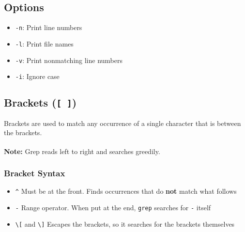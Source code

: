 \documentclass[13pt]{article}
\begin{document}
\subsection{Options}
\begin{itemize}[leftmargin = 0pt]
\item [] \texttt{-n}: Print line numbers
\item [] \texttt{-l}: Print file names
\item [] \texttt{-v}: Print nonmatching line numbers
\item [] \texttt{-i}: Ignore case
\end{itemize}
\subsection{Brackets (\texttt{[ ]})}
Brackets are used to match any occurrence of a single character that is between the brackets. \\ \\
\textbf{Note:} Grep reads left to right and searches greedily.
\subsubsection{Bracket Syntax}
\begin{itemize}[leftmargin = 0pt]
\item [] \texttt{\^} Must be at the front. Finds occurrences that do \textbf{not} match what follows
\item [] \texttt{-} Range operator. When put at the end, \texttt{grep} searches for \texttt{-} itself
\item [] \texttt{\textbackslash [} and \texttt{\textbackslash ]} Escapes the brackets, so it searches for the brackets themselves
\end{itemize}
\end{document}
